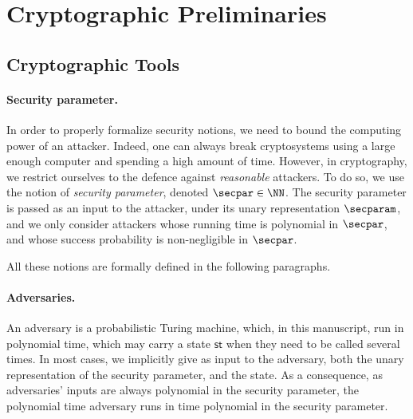 
\section{Cryptographic Preliminaries} %
\label{sec:cryptographic_preliminaries}


\subsection{Cryptographic Tools} %
\label{sub:cryptographic_defs}

\paragraph{Security parameter.} %
\label{par:def_security_parameter}

In order to properly formalize security notions, we need to bound the computing power of an attacker.
Indeed, one can always break cryptosystems using a large enough computer and spending a high amount of time.
However, in cryptography, we restrict ourselves to the defence against \emph{reasonable} attackers.
To do so, we use the notion of \emph{security parameter}, denoted $\secpar \in \NN$.
The security parameter is passed as an input to the attacker, under its unary representation $\secparam$, and we only consider attackers whose running time is polynomial in $\secpar$, and whose success probability is non-negligible in $\secpar$.

All these notions are formally defined in the following paragraphs.


\paragraph{Adversaries.} %
\label{par:def_adversaries}

An adversary is a probabilistic Turing machine, which, in this manuscript, run in polynomial time, which may carry a state $\mathsf{st}$ when they need to be called several times.
In most cases, we implicitly give as input to the adversary, both the unary representation of the security parameter, and the state.
As a consequence, as adversaries' inputs are always polynomial in the security parameter, the polynomial time adversary runs in time polynomial in the security parameter.



